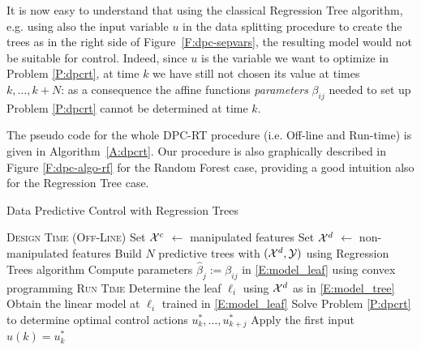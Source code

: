 \textcolor[rgb]{0,0,1}{\begin{remark}
It is now easy to understand that using the classical Regression Tree algorithm, e.g. using also the input variable $u$ in the data splitting procedure to create the trees as in the right side of Figure~\ref{F:dpc-sepvars}, the resulting model would not be suitable for control. Indeed, since $u$ is the variable we want to optimize in Problem \ref{P:dpcrt}, at time $k$ we have still not chosen its value at times $k, \ldots, k+N$: as a consequence the affine functions \emph{parameters }$\beta_{ij}$ needed to set up Problem \ref{P:dpcrt} cannot be determined at time $k$.
\end{remark}}


\textcolor[rgb]{0,0,1}{The pseudo code for the whole DPC-RT procedure (i.e. Off-line and Run-time) is given in Algorithm~\ref{A:dpcrt}. Our procedure is also graphically described in Figure \ref{F:dpc-algo-rf} for the Random Forest case, providing a good intuition also for the Regression Tree case.}


\textcolor[rgb]{0,0,1}{\begin{algorithm}[ht!]
	\caption{Data Predictive Control with Regression Trees}
	\label{A:dpcrt}
	\begin{algorithmic}[1]
		\State \textsc{Design Time (Off-Line)}
		\State Set $\mathcal{X}^c$ $\gets$ manipulated features
		\State Set $\mathcal{X}^d$ $\gets$ non-manipulated features
		\State Build $N$ predictive trees with $(\mathcal{X}^d,\mathcal{Y})$ using Regression Trees algorithm
		\State Compute parameters $\hat\beta_j:=\beta_{ij}$ in \eqref{E:model_leaf} using convex programming
		\EndFor
		\EndFor
		\EndProcedure
		\State \textsc{Run Time}
		\State Determine the leaf $\ell_i$ using $\mathcal{X}^d$ as in \eqref{E:model_tree}
		\State Obtain the linear model at $\ell_i$ trained in \eqref{E:model_leaf}
		\EndFor
		\State Solve Problem \ref{P:dpcrt} to determine optimal
		\State control actions $u^*_k,\ldots,u^*_{k+j}$
		\State Apply the first input $u(k)=u^*_k$
		\EndWhile
		\EndProcedure
	\end{algorithmic}
\end{algorithm}}





